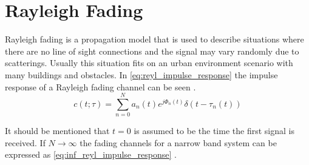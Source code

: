 	
\section{Rayleigh Fading} 



Rayleigh fading is a propagation model that is used to describe situations where there are no line of sight connections and the signal may vary randomly due to scatterings. Usually this situation fits on an urban environment scenario with many buildings and obstacles. In \autoref{eq:reyl_impulse_response} the impulse response of a Rayleigh fading channel can be seen \citep{MeasurementComplexRay}.
\begin{equation}\label{eq:reyl_impulse_response}
c(t;\tau) = \sum_{n =0}^{N} a_n(t)e^{j\Phi_n(t)} \delta (t-\tau_n(t))
\end{equation}

\begin{where}
\end{where}


It should be mentioned that $t=0$ is assumed to be the time the first signal is received. If $N \rightarrow \infty$ the fading channels for a narrow band system can be expressed as \autoref{eq:inf_reyl_impulse_response} \citep{MeasurementComplexRay}. 

